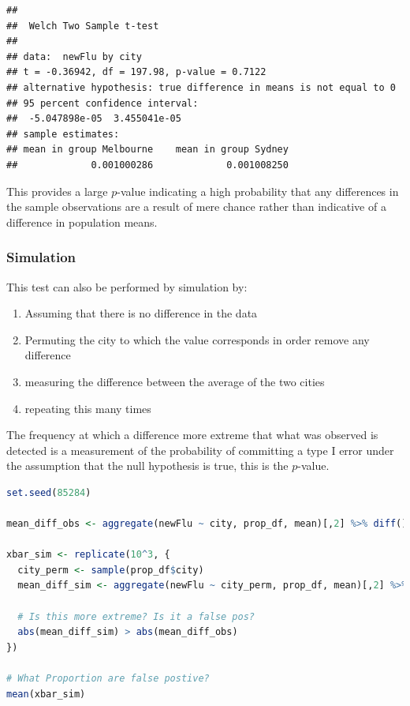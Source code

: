 \documentclass{article}
\providecommand{\tightlist}{%
  \setlength{\itemsep}{0pt}\setlength{\parskip}{0pt}}
\begin{document}
\begin{lstlisting}
## 
##  Welch Two Sample t-test
## 
## data:  newFlu by city
## t = -0.36942, df = 197.98, p-value = 0.7122
## alternative hypothesis: true difference in means is not equal to 0
## 95 percent confidence interval:
##  -5.047898e-05  3.455041e-05
## sample estimates:
## mean in group Melbourne    mean in group Sydney 
##             0.001000286             0.001008250
\end{lstlisting}

This provides a large \(p\)-value indicating a high probability that any
differences in the sample observations are a result of mere chance
rather than indicative of a difference in population means.

\hypertarget{simulation}{%
\subsubsection{Simulation}\label{simulation}}

This test can also be performed by simulation by:

\begin{enumerate}
\def\labelenumi{\arabic{enumi}.}
\tightlist
\item
  Assuming that there is no difference in the data
\item
  Permuting the city to which the value corresponds in order remove any
  difference
\item
  measuring the difference between the average of the two cities
\item
  repeating this many times
\end{enumerate}

The frequency at which a difference more extreme that what was observed
is detected is a measurement of the probability of committing a type I
error under the assumption that the null hypothesis is true, this is the
\(p\)-value.

\begin{lstlisting}[language=R]
set.seed(85284)

mean_diff_obs <- aggregate(newFlu ~ city, prop_df, mean)[,2] %>% diff()

xbar_sim <- replicate(10^3, {
  city_perm <- sample(prop_df$city)
  mean_diff_sim <- aggregate(newFlu ~ city_perm, prop_df, mean)[,2] %>% diff()

  # Is this more extreme? Is it a false pos?
  abs(mean_diff_sim) > abs(mean_diff_obs)
})

# What Proportion are false postive?
mean(xbar_sim)
\end{lstlisting}
\end{document}
